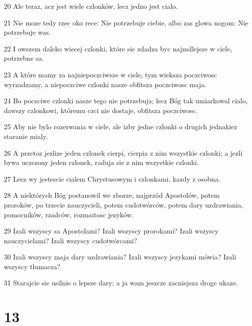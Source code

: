 \par 20 Ale teraz, acz jest wiele czlonków, lecz jedno jest cialo.
\par 21 Nie moze tedy rzec oko rece: Nie potrzebuje ciebie, albo zas glowa nogom: Nie potrzebuje was.
\par 22 I owszem daleko wiecej czlonki, które sie zdadza byc najmdlejsze w ciele, potrzebne sa.
\par 23 A które mamy za najniepoczciwsze w ciele, tym wieksza poczciwosc wyrzadzamy, a niepoczciwe czlonki nasze obfitsza poczciwosc maja.
\par 24 Bo poczciwe czlonki nasze tego nie potrzebuja; lecz Bóg tak umiarkowal cialo, dawszy czlonkowi, któremu czci nie dostaje, obfitsza poczciwosc.
\par 25 Aby nie bylo rozerwania w ciele, ale izby jedne czlonki o drugich jednakiez staranie mialy.
\par 26 A przetoz jezlize jeden czlonek cierpi, cierpia z nim wszystkie czlonki; a jezli bywa uczczony jeden czlonek, raduja sie z nim wszystkie czlonki.
\par 27 Lecz wy jestescie cialem Chrystusowym i czlonkami, kazdy z osobna.
\par 28 A niektórych Bóg postanowil we zborze, najprzód Apostolów, potem proroków, po trzecie nauczycieli, potem cudotwórców, potem dary uzdrawiania, pomocników, rzadców, rozmaitosc jezyków.
\par 29 Izali wszyscy sa Apostolami? Izali wszyscy prorokami? Izali wszyscy nauczycielami? Izali wszyscy cudotwórcami?
\par 30 Izali wszyscy maja dary uzdrawiania? Izali wszyscy jezykami mówia? Izali wszyscy tlumacza?
\par 31 Starajcie sie usilnie o lepsze dary; a ja wam jeszcze zacniejsza droge ukaze.

\chapter{13}


